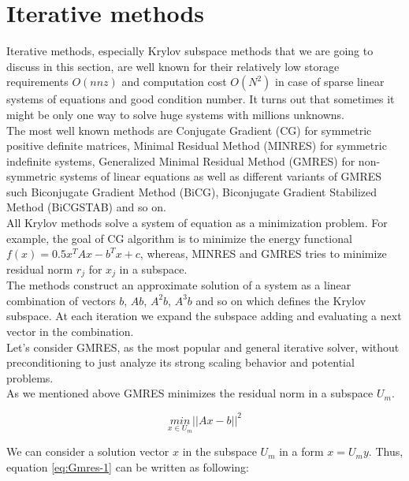 \section{Iterative methods}
\label{subseq:iterative methods}
Iterative methods, especially Krylov subspace methods that we are going to discuss in this section, are well known for their relatively low storage requirements $O(nnz)$ and computation cost $O(N^2)$ in case of sparse linear systems of equations and good condition number. It turns out that sometimes it might be only one way to solve huge systems with millions unknowns.\\

The most well known methods are Conjugate Gradient (CG) for symmetric positive definite matrices, Minimal Residual Method (MINRES) for symmetric indefinite systems, Generalized Minimal Residual Method (GMRES) for non-symmetric systems of linear equations as well as different variants of GMRES such Biconjugate Gradient Method (BiCG), Biconjugate Gradient Stabilized Method (BiCGSTAB) and so on.\\

All Krylov methods solve a system of equation as a minimization problem. For example, the goal of CG algorithm is to minimize the energy functional $f(x) = 0.5 x^T A x - b^T x + c$, whereas, MINRES and GMRES tries to minimize residual norm $r_{j}$ for $x_{j}$ in a subspace. \\


The methods construct an approximate solution of a system as a linear combination of vectors $b$, $Ab$, $A^2b$, $A^3b$ and so on which defines the Krylov subspace. At each iteration we expand the subspace adding and evaluating a next vector in the combination.\\

Let's consider GMRES, as the most popular and general iterative solver, without preconditioning to just analyze its strong scaling behavior and potential problems. \\ 

As we mentioned above GMRES minimizes the residual norm in a subspace $U_m$.

\begin{equation} \label{eq:Gmres-1}
	\underset{x \in U_m}{min}||Ax - b||^2
\end{equation}

We can consider a solution vector $x$ in the subspace $U_m$ in a form $x=U_m y$. Thus, equation \ref{eq:Gmres-1} can be written as following:

